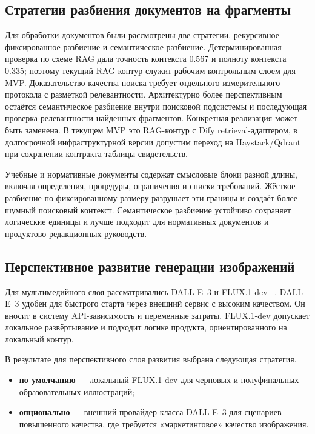 \subsection{Стратегии разбиения документов на фрагменты}

Для обработки документов были рассмотрены две стратегии.
рекурсивное фиксированное разбиение и семантическое разбиение.
Детерминированная проверка по схеме RAG дала точность контекста 0.567 и
полноту контекста 0.335; поэтому текущий RAG-контур служит
рабочим контрольным слоем для MVP. Доказательство качества поиска требует
отдельного измерительного протокола с разметкой релевантности.
Архитектурно более перспективным остаётся семантическое
разбиение внутри поисковой подсистемы и последующая проверка
релевантности найденных фрагментов.
Конкретная реализация может быть заменена. В текущем MVP это
RAG-контур с Dify retrieval-адаптером, в долгосрочной инфраструктурной
версии допустим переход на Haystack/Qdrant
при сохранении контракта таблицы свидетельств.

Учебные и нормативные документы содержат смысловые блоки разной длины,
включая определения, процедуры, ограничения и списки требований. Жёсткое разбиение по фиксированному размеру разрушает
эти границы и создаёт более шумный поисковый контекст. Семантическое
разбиение устойчиво сохраняет логические единицы и лучше подходит
для нормативных документов и продуктово-редакционных руководств.

\subsection{Перспективное развитие генерации изображений}

Для мультимедийного слоя рассматривались DALL-E~3 и FLUX.1-dev
~\cite{dalle3_2023, flux_2024}. DALL-E~3 удобен для быстрого старта
через внешний сервис с высоким качеством. Он вносит в систему
API-зависимость и переменные затраты. FLUX.1-dev допускает локальное
развёртывание и подходит логике продукта,
ориентированного на локальный контур.

В результате для перспективного слоя развития выбрана следующая стратегия.

\begin{itemize}
  \item \textbf{по умолчанию} — локальный FLUX.1-dev для черновых
    и полуфинальных образовательных иллюстраций;
  \item \textbf{опционально} — внешний провайдер класса DALL-E~3
    для сценариев повышенного качества, где требуется «маркетинговое»
    качество изображения.
\end{itemize}

